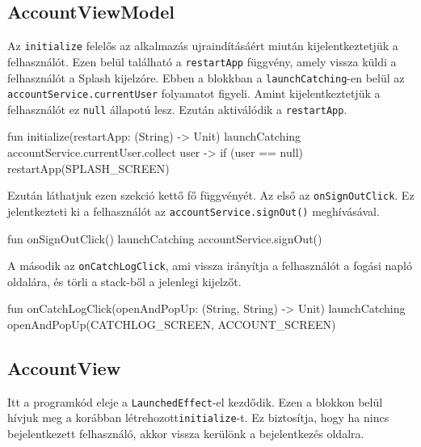 \subsection{AccountViewModel}

Az \texttt{initialize} felelős az alkalmazás ujraindításáért miután kijelentkeztetjük a felhasználót.
Ezen belül található a \texttt{restartApp} függvény, amely vissza küldi a felhasználót a Splash kijelzóre.
Ebben a blokkban a \texttt{launchCatching}-en belül az
\newline
\texttt{accountService.currentUser} folyamatot figyeli. Amint kijelentkeztetjük a felhasználót ez \texttt{null} állapotú lesz. Ezután aktiválódik a \texttt{restartApp}.

\begin{java}
fun initialize(restartApp: (String) -> Unit) {
    launchCatching {
        accountService.currentUser.collect { user ->
            if (user == null) restartApp(SPLASH_SCREEN)
        }
    }
}

\end{java}

\newpage

Ezután láthatjuk ezen szekció kettő fő függvényét.
Az első az \texttt{onSignOutClick}. Ez jelentkezteti ki a felhasználót az \texttt{accountService.signOut()} meghívásával.

\begin{java}
fun onSignOutClick() {
    launchCatching {
        accountService.signOut()
    }
}
\end{java}

A második az \texttt{onCatchLogClick}, ami vissza irányítja a felhasználót a fogási napló oldalára, és törli a stack-ből a jelenlegi kijelzőt.

\begin{java}
fun onCatchLogClick(openAndPopUp: (String, String) -> Unit){
    launchCatching {
        openAndPopUp(CATCHLOG_SCREEN, ACCOUNT_SCREEN)
    }
}    
\end{java}

\subsection{AccountView}

Itt a programkód eleje a \texttt{LaunchedEffect}-el kezdődik. Ezen a blokkon belül hívjuk meg a korábban létrehozott\texttt{initialize}-t. Ez biztosítja, hogy ha nincs bejelentkezett felhasználó, akkor vissza kerülönk a bejelentkezés oldalra.

